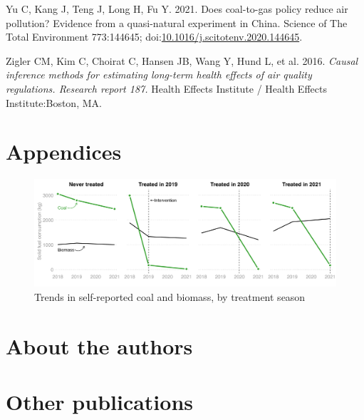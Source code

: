 \documentclass[
  letterpaper,
  DIV=11,
  numbers=noendperiod]{scrartcl}
\newlength{\cslhangindent}
\newlength{\cslentryspacingunit} %
\newenvironment{CSLReferences}[2] %
 {%
  \setlength{\parindent}{0pt}
  \ifodd #1
  \let\oldpar\par
  \def\par{\hangindent=\cslhangindent\oldpar}
  \fi
  \setlength{\parskip}{#2\cslentryspacingunit}
 }%
 {}
\begin{document}
\begin{CSLReferences}{1}{0}
\leavevmode{}%
Yu C, Kang J, Teng J, Long H, Fu Y. 2021. Does coal-to-gas policy reduce
air pollution? {Evidence} from a quasi-natural experiment in {China}.
Science of The Total Environment 773:144645;
doi:\href{https://doi.org/10.1016/j.scitotenv.2020.144645}{10.1016/j.scitotenv.2020.144645}.

\leavevmode{}%
Zigler CM, Kim C, Choirat C, Hansen JB, Wang Y, Hund L, et al. 2016.
\emph{Causal inference methods for estimating long-term health effects
of air quality regulations. {Research} report 187.} Health Effects
Institute / Health Effects Institute:Boston, MA.

\end{CSLReferences}

\newpage
\appendix
\renewcommand{\thefigure}{A\arabic{figure}}
\renewcommand{\thetable}{A\arabic{table}}
\setcounter{figure}{0}
\setcounter{table}{0}

\hypertarget{appendices}{%
\section*{Appendices}\label{appendices}}

\begin{figure}[H]

{\centering \includegraphics[width=1\textwidth,height=\textheight]{images/coal-plot.png}

}

\caption{\label{fig-afig-coal}Trends in self-reported coal and biomass,
by treatment season}

\end{figure}

\hypertarget{about-the-authors}{%
\section*{About the authors}\label{about-the-authors}}

\hypertarget{other-publications}{%
\section*{Other publications}\label{other-publications}}
\end{document}
